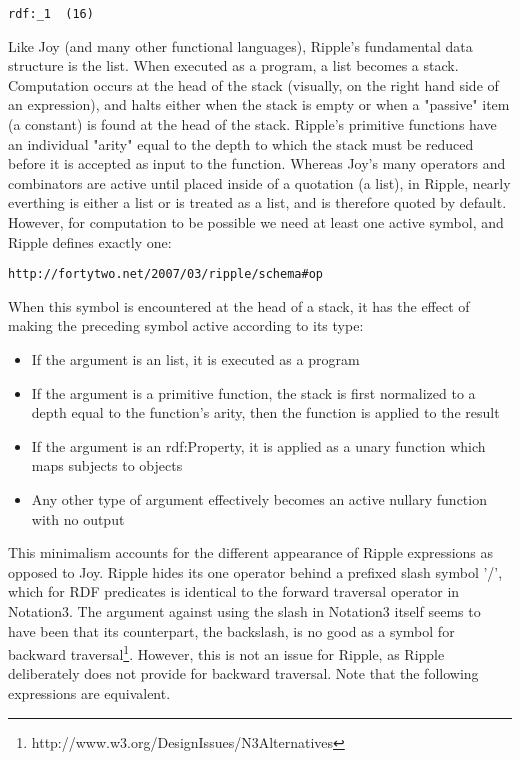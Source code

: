 \documentclass[runningheads]{llncs}
\begin{document}
\begin{verbatim}
rdf:_1  (16)
\end{verbatim}







Like Joy (and many other functional languages), Ripple's fundamental data structure is the list.  When executed as a program, a list becomes a stack.  Computation occurs at the head of the stack (visually, on the right hand side of an expression), and halts either when the stack is empty or when a "passive" item (a constant) is found at the head of the stack.  Ripple's primitive functions have an individual "arity" equal to the depth to which the stack must be reduced before it is accepted as input to the function.  Whereas Joy's many operators and combinators are active until placed inside of a quotation (a list), in Ripple, nearly everthing is either a list or is treated as a list, and is therefore quoted by default.  However, for computation to be possible we need at least one active symbol, and Ripple defines exactly one:

\begin{verbatim}
http://fortytwo.net/2007/03/ripple/schema#op
\end{verbatim}

When this symbol is encountered at the head of a stack, it has the effect of making the preceding symbol active according to its type:
\begin{itemize}
\item If the argument is an list, it is executed as a program
\item If the argument is a primitive function, the stack is first normalized to a depth equal to the function's arity, then the function is applied to the result
\item If the argument is an rdf:Property, it is applied as a unary function which maps subjects to objects
\item Any other type of argument effectively becomes an active nullary function with no output
\end{itemize}

This minimalism accounts for the different appearance of Ripple expressions as opposed to Joy.  Ripple hides its one operator behind a prefixed slash symbol '/', which for RDF predicates is identical to the forward traversal operator in Notation3.  The argument against using the slash in Notation3 itself seems to have been that its counterpart, the backslash, is no good as a symbol for backward traversal\footnote{http://www.w3.org/DesignIssues/N3Alternatives}.  However, this is not an issue for Ripple, as Ripple deliberately does not provide for backward traversal.  Note that the following expressions are equivalent.
\end{document}

